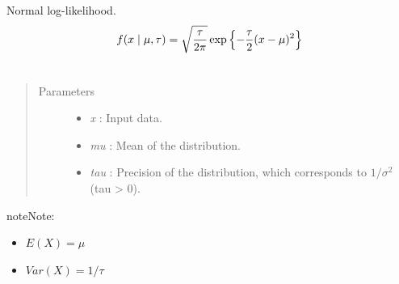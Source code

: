 \documentclass[letterpaper,10pt,english]{sphinxmanual}
\begin{document}
\begin{fulllineitems}
\label{distributions:pymc.distributions.normal_like}
Normal log-likelihood.
\begin{gather}
\begin{split}f(x \mid \mu, \tau) = \sqrt{\frac{\tau}{2\pi}} \exp\left\{ -\frac{\tau}{2} (x-\mu)^2 \right\}\end{split}\notag\\\begin{split}\end{split}\notag
\end{gather}\begin{quote}\begin{description}
\item[{Parameters }] \leavevmode\begin{itemize}
\item {} 
\emph{x} : Input data.

\item {} 
\emph{mu} : Mean of the distribution.

\item {} 
\emph{tau} : Precision of the distribution, which corresponds to
$1/\sigma^2$ (tau \textgreater{} 0).

\end{itemize}

\end{description}\end{quote}

\begin{notice}{note}{Note:}\begin{itemize}
\item {} 
$E(X) = \mu$

\item {} 
$Var(X) = 1/\tau$

\end{itemize}
\end{notice}

\end{fulllineitems}

\end{document}
